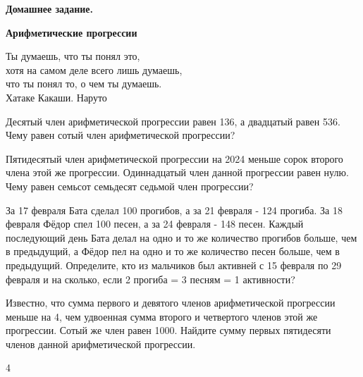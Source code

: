 \hspace{3mm}

\centerline{\bf \Huge Домашнее задание.}
\centerline{\bf \Huge Арифметические прогрессии}

\begin{flushright}
    \scriptsize{Ты думаешь, что ты понял это, \\хотя на самом деле всего лишь думаешь,\\ что ты понял то, о чем ты думаешь. \\Хатаке Какаши. Наруто}
\end{flushright}

 Десятый член арифметической прогрессии равен 136, а двадцатый равен 536. Чему равен сотый член арифметической прогрессии?

 Пятидесятый член арифметической прогрессии на 2024 меньше сорок второго члена этой же прогрессии. Одиннадцатый член данной прогрессии равен нулю. Чему равен семьсот семьдесят седьмой член прогрессии?

 За 17 февраля Бата сделал 100 прогибов, а за 21 февраля - 124 прогиба. За 18 февраля Фёдор спел 100 песен, а за 24 февраля - 148 песен. Каждый последующий день Бата делал на одно и то же количество прогибов больше, чем в предыдущий, а Фёдор пел на одно и то же количество песен больше, чем в предыдущий. Определите, кто из мальчиков был активней с 15 февраля по 29 февраля и на сколько, если 2 прогиба = 3 песням = 1 активности?

 Известно, что сумма первого и девятого членов арифметической прогрессии меньше на 4, чем удвоенная сумма второго и четвертого членов этой же прогрессии. Сотый же член равен 1000. Найдите сумму первых пятидесяти членов данной арифметической прогрессии.

4